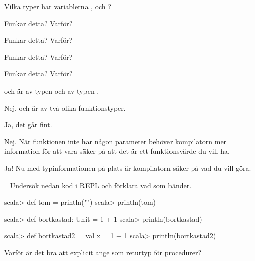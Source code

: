 \Subtask Vilka typer har variablerna ,  och ?

\Subtask Funkar detta? Varför? 

\Subtask Funkar detta? Varför? 

\Subtask Funkar detta? Varför? 

\Subtask Funkar detta? Varför? 

\SOLUTION

\TaskSolved \what

\SubtaskSolved

\begin{ConceptConnections}
  
\end{ConceptConnections}

\SubtaskSolved {} och  är av typen  och  av typen .

\SubtaskSolved  Nej.  och  är av två olika funktionstyper.

\SubtaskSolved  Ja, det går fint.

\SubtaskSolved  Nej. När funktionen inte har någon parameter behöver kompilatorn mer information för att vara säker på att det är ett funktionsvärde du vill ha.

\SubtaskSolved Ja! Nu med typinformationen på plats är kompilatorn säker på vad du vill göra.

\QUESTEND




\QUESTBEGIN

\Task  \what~ Undersök nedan kod i REPL och förklara vad som händer.

\Subtask
\begin{REPL}
scala> def tom = println("")
scala> println(tom)
\end{REPL}

\Subtask
\begin{REPL}
scala> def bortkastad: Unit = 1 + 1
scala> println(bortkastad)
\end{REPL}

\Subtask
\begin{REPL}
scala> def bortkastad2 = { val x = 1 + 1 }
scala> println(bortkastad2)
\end{REPL}

\Subtask Varför är det bra att explicit ange  som returtyp för procedurer?

